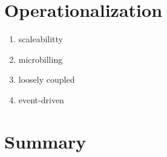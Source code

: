 \section{Operationalization}


\begin{enumerate}
    \item scaleabilitty
    \item microbilling
    \item loosely coupled
    \item event-driven
\end{enumerate}



\section{Summary}
